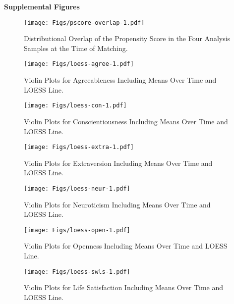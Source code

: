 \documentclass[
  english,
  man, noextraspace]{apa7}
\newenvironment{lltable}{\begin{landscape}\begin{center}\begin{ThreePartTable}}{\end{ThreePartTable}\end{center}\end{landscape}}
\begin{document}
\begin{appendix}
\begin{lltable}
{}

\end{lltable}

\noindent \textbf{Supplemental Figures}




\begin{figure}
\centering
\texttt{[image: Figs/pscore-overlap-1.pdf]}
\caption{\label{fig:pscore-overlap}Distributional Overlap of the Propensity Score
in the Four Analysis Samples at the Time of Matching.}
\end{figure}




\begin{figure}
\centering
\texttt{[image: Figs/loess-agree-1.pdf]}
\caption{\label{fig:loess-agree}Violin Plots for Agreeableness Including Means
Over Time and LOESS Line.}
\end{figure}




\begin{figure}
\centering
\texttt{[image: Figs/loess-con-1.pdf]}
\caption{\label{fig:loess-con}Violin Plots for Conscientiousness Including Means
Over Time and LOESS Line.}
\end{figure}




\begin{figure}
\centering
\texttt{[image: Figs/loess-extra-1.pdf]}
\caption{\label{fig:loess-extra}Violin Plots for Extraversion Including Means Over
Time and LOESS Line.}
\end{figure}




\begin{figure}
\centering
\texttt{[image: Figs/loess-neur-1.pdf]}
\caption{\label{fig:loess-neur}Violin Plots for Neuroticism Including Means Over
Time and LOESS Line.}
\end{figure}




\begin{figure}
\centering
\texttt{[image: Figs/loess-open-1.pdf]}
\caption{\label{fig:loess-open}Violin Plots for Openness Including Means Over Time
and LOESS Line.}
\end{figure}




\begin{figure}
\centering
\texttt{[image: Figs/loess-swls-1.pdf]}
\caption{\label{fig:loess-swls}Violin Plots for Life Satisfaction Including Means
Over Time and LOESS Line.}
\end{figure}









\end{appendix}
\end{document}
